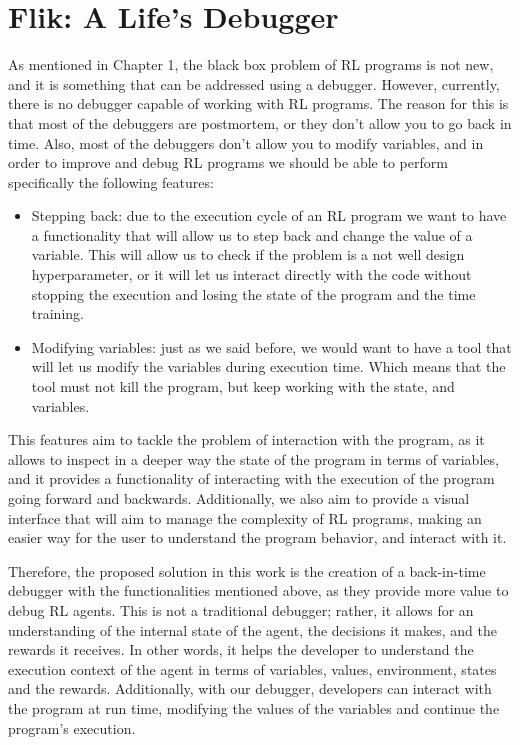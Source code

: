 
\chapter{Flik: A Life's Debugger}
\label{cha:solution}

As mentioned in Chapter 1, the black box problem of \ac{RL} programs is 
not new, and it is something 
that can be addressed using a debugger. However, currently, there is no 
debugger capable of working with RL programs. The reason for this is that 
most of the debuggers are postmortem, or they don't allow you to go back in 
time. Also, most of the debuggers don't allow you to modify variables, and in 
order to improve and debug \ac{RL} programs we should be able to perform 
specifically the following features:

\begin{itemize}
    \item Stepping back: due to the execution cycle of an \ac{RL} program we 
    want to have a functionality that will allow us to step back and change 
    the value of a variable. This will allow us to check if the problem is a 
    not well design hyperparameter, or it will let us interact directly with 
    the code without stopping the execution and losing the state of the program 
    and the time training. 
    \item Modifying variables: just as we said before, we would want to have a 
    tool that will let us modify the variables during execution time. Which means
    that the tool must not kill the program, but keep working with the state, 
    and variables.
\end{itemize}

This features aim to tackle the problem of interaction with the program, as it allows 
to inspect in a deeper way the state of the program in terms of variables, and it provides
a functionality of interacting with the execution of the program going forward and backwards.
Additionally, we also aim to provide a visual interface that will aim to manage the 
complexity of \ac{RL} programs, making an easier way for the user to understand 
the program behavior, and interact with it.

Therefore, the proposed solution in this work is the creation of a back-in-time debugger with the 
functionalities mentioned above, as they provide more value to debug \ac{RL} agents. This 
is not a traditional debugger; rather, it allows for an understanding of the 
internal state of the agent, the decisions it makes, and the rewards it 
receives. In other words, it helps the developer to understand the execution context of the
agent in terms of variables, values, environment, states and the rewards. Additionally, with 
our debugger, developers can interact with the program at run time, modifying the values 
of the variables and continue the program's execution.

